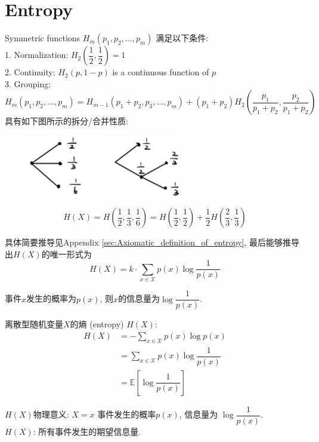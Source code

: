 \section{Entropy}

Symmetric functions $H_m\left(p_1, p_2, \ldots, p_m\right)$ 满足以下条件: \\
1. Normalization: $H_2\left(\dfrac{1}{2}, \dfrac{1}{2}\right)=1$ \\
2. Continuity: $H_2(p, 1-p)$ is a continuous function of $p$ \\
3. Grouping: $H_m\left(p_1, p_2, \ldots, p_m\right)=H_{m-1}\left(p_1+p_2, p_3, \ldots, p_m\right)+\left(p_1+p_2\right) H_2\left(\dfrac{p_1}{p_1+p_2}, \dfrac{p_2}{p_1+p_2}\right)$ \\
具有如下图所示的拆分/合并性质:
\begin{figure}[htbp]
    \centering
    \includegraphics[width=0.6\textwidth]{./figures/chapter1/entropy_deduction.png}
\end{figure}
$$H(X)=H\left(\dfrac{1}{2},\dfrac{1}{3},\dfrac{1}{6}\right)=H\left(\dfrac{1}{2},\dfrac{1}{2}\right)+\dfrac{1}{2}H\left(\dfrac{2}{3},\dfrac{1}{3}\right)$$

具体简要推导见Appendix \ref{sec:Axiomatic_definition_of_entropy}, 最后能够推导出$H(X)$的唯一形式为
$$H(X)=k\cdot \sum_{x\in\mathcal{X}}p(x)\log\dfrac{1}{p(x)}$$

\begin{definition}
事件$x$发生的概率为$p(x)$, 则$x$的信息量为$\log\dfrac{1}{p(x)}$.
\end{definition}

\begin{definition}
离散型随机变量$X$的熵 (entropy) $H(X)$:
\begin{align*}
    H(X)&= -\sum_{x\in\mathcal{X}}p(x)\log p(x) \\
        &= \sum_{x\in\mathcal{X}}p(x)\log\dfrac{1}{p(x)} \\
        &= \mathbb{E}\left[\log\dfrac{1}{p(x)}\right]
\end{align*}
\end{definition}

$H(X)$物理意义: $X=x$ 事件发生的概率$p(x)$, 信息量为 $\log\dfrac{1}{p(x)}$. \\
$H(X)$: 所有事件发生的期望信息量.

